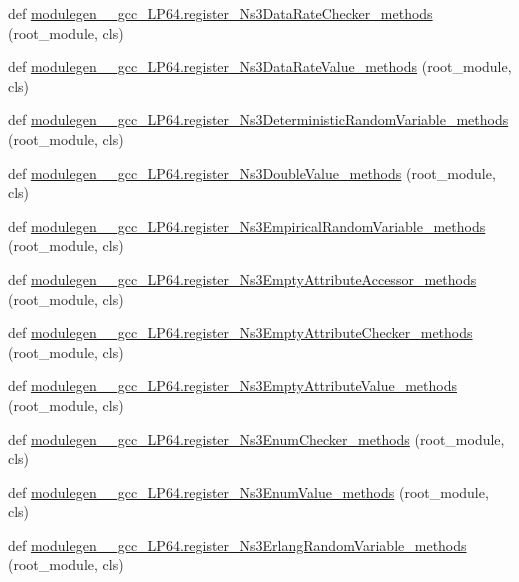 \begin{DoxyCompactItemize}
\item 
def \hyperlink{namespacemodulegen____gcc__LP64_ab2f42b6063e5e94cdc2dc949e695869f}{modulegen\+\_\+\+\_\+gcc\+\_\+\+L\+P64.\+register\+\_\+\+Ns3\+Data\+Rate\+Checker\+\_\+methods} (root\+\_\+module, cls)
\item 
def \hyperlink{namespacemodulegen____gcc__LP64_a5a6db47983f455cd703998c947346f9a}{modulegen\+\_\+\+\_\+gcc\+\_\+\+L\+P64.\+register\+\_\+\+Ns3\+Data\+Rate\+Value\+\_\+methods} (root\+\_\+module, cls)
\item 
def \hyperlink{namespacemodulegen____gcc__LP64_a627e4424c53832709ec25ad4e541cec5}{modulegen\+\_\+\+\_\+gcc\+\_\+\+L\+P64.\+register\+\_\+\+Ns3\+Deterministic\+Random\+Variable\+\_\+methods} (root\+\_\+module, cls)
\item 
def \hyperlink{namespacemodulegen____gcc__LP64_aa85ace5d2bc740d08990445641c7b690}{modulegen\+\_\+\+\_\+gcc\+\_\+\+L\+P64.\+register\+\_\+\+Ns3\+Double\+Value\+\_\+methods} (root\+\_\+module, cls)
\item 
def \hyperlink{namespacemodulegen____gcc__LP64_a62433119796a27d3b8c284710fe975f9}{modulegen\+\_\+\+\_\+gcc\+\_\+\+L\+P64.\+register\+\_\+\+Ns3\+Empirical\+Random\+Variable\+\_\+methods} (root\+\_\+module, cls)
\item 
def \hyperlink{namespacemodulegen____gcc__LP64_a5885028edb9b0cbbdf4f75d1388d6b19}{modulegen\+\_\+\+\_\+gcc\+\_\+\+L\+P64.\+register\+\_\+\+Ns3\+Empty\+Attribute\+Accessor\+\_\+methods} (root\+\_\+module, cls)
\item 
def \hyperlink{namespacemodulegen____gcc__LP64_aa52eca018e0116d17b4c6c2798dcee71}{modulegen\+\_\+\+\_\+gcc\+\_\+\+L\+P64.\+register\+\_\+\+Ns3\+Empty\+Attribute\+Checker\+\_\+methods} (root\+\_\+module, cls)
\item 
def \hyperlink{namespacemodulegen____gcc__LP64_a86864e6a4eb56d909f7b4550592ead3b}{modulegen\+\_\+\+\_\+gcc\+\_\+\+L\+P64.\+register\+\_\+\+Ns3\+Empty\+Attribute\+Value\+\_\+methods} (root\+\_\+module, cls)
\item 
def \hyperlink{namespacemodulegen____gcc__LP64_a85ff01ac79401b893725f8ef09197d8f}{modulegen\+\_\+\+\_\+gcc\+\_\+\+L\+P64.\+register\+\_\+\+Ns3\+Enum\+Checker\+\_\+methods} (root\+\_\+module, cls)
\item 
def \hyperlink{namespacemodulegen____gcc__LP64_a87d62ec8f015ce6b6fc14fcb3c75ca80}{modulegen\+\_\+\+\_\+gcc\+\_\+\+L\+P64.\+register\+\_\+\+Ns3\+Enum\+Value\+\_\+methods} (root\+\_\+module, cls)
\item 
def \hyperlink{namespacemodulegen____gcc__LP64_a7b3e5038bffbb5bc57da9d63ad434648}{modulegen\+\_\+\+\_\+gcc\+\_\+\+L\+P64.\+register\+\_\+\+Ns3\+Erlang\+Random\+Variable\+\_\+methods} (root\+\_\+module, cls)

\end{DoxyCompactItemize}
